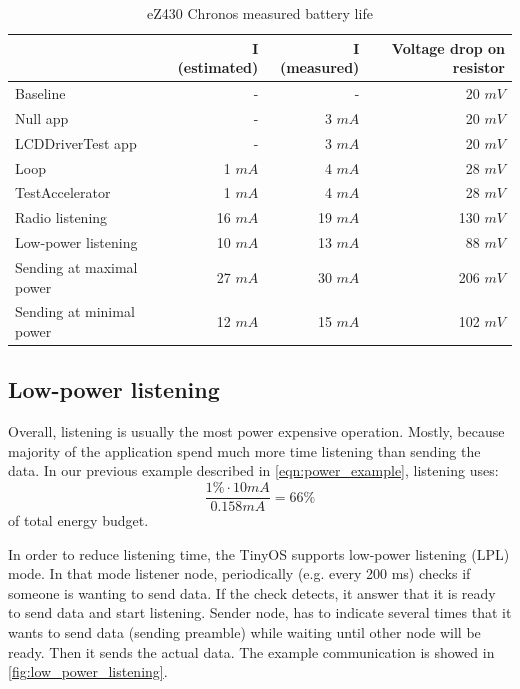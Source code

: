 \begin{table}[h]
  \centering
    \begin{tabular}{|l|r|r|r|}
        \hline
              & \textbf{I (estimated)} & \textbf{I (measured)}          & \textbf{Voltage drop on resistor}  \\ \hline
Baseline & - & - & 20 $ mV $ \\ \hline
Null app    & - & 3 $ mA $          & 20 $ mV $  \\ \hline
LCDDriverTest app    & - & 3 $ mA $ & 20 $ mV $  \\ \hline
Loop    & 1 $ mA $ & 4 $ mA $          & 28 $ mV $  \\ \hline
TestAccelerator     & 1 $ mA $ & 4 $ mA $          & 28 $ mV $  \\ \hline
Radio listening     & 16 $ mA $ & 19 $ mA $   & 130 $ mV $  \\ \hline
Low-power listening     & 10 $ mA $ & 13 $ mA $              & 88 $ mV $  \\ \hline
Sending at maximal power     & 27 $ mA $ & 30 $ mA $              & 206 $ mV $  \\ \hline
Sending at minimal power      & 12 $ mA $ & 15 $ mA $            & 102 $ mV $  \\ \hline

    \end{tabular}
  \caption{eZ430 Chronos measured battery life}
  \label{tab:power-usage}
\end{table}

\subsection{Low-power listening}

Overall, listening is usually the most power expensive operation.
Mostly, because majority of the application spend much more time listening than sending the data.
In our previous example described in \ref{eqn:power_example}, listening uses:
$$
\frac{1 \% \cdot 10 mA}{0.158 mA} = 66 \%
$$
of total energy budget.

In order to reduce listening time, the TinyOS supports low-power listening (LPL) mode.
In that mode listener node, periodically (e.g. every 200 ms) checks if someone is wanting to send data.
If the check detects, it answer that it is ready to send data and start listening.
Sender node, has to indicate several times that it wants to send data (sending preamble) while waiting until other node will be ready.
Then it sends the actual data.
The example communication is showed in \ref{fig:low_power_listening}.

